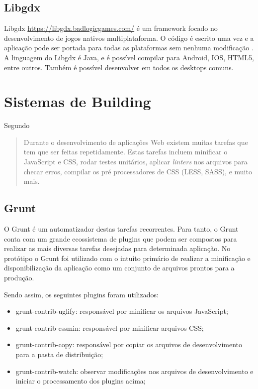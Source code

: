 \section{Libgdx}

Libgdx \url{https://libgdx.badlogicgames.com/} é um framework
focado no desenvolvimento de jogos nativos multiplataforma. O
código é escrito uma vez e a aplicação pode ser portada para
todas as plataformas sem nenhuma modificação \autocite[p.
8]{crossPlatformMobileGameDevelopment}. A linguagem do Libgdx é Java, e
é possível compilar para Android, IOS, HTML5, entre outros. Também é
possível desenvolver em todos os desktops comuns.

\chapter{Sistemas de Building}

Segundo \citet{gruntTutorial}
\begin{quote}
Durante o desenvolvimento de aplicações Web existem muitas tarefas
que tem que ser feitas repetidamente. Estas tarefas incluem minificar o
JavaScript e CSS, rodar testes unitários, aplicar \textit{linters} nos
arquivos para checar erros, compilar os pré processadores de CSS (LESS,
SASS), e muito mais.
\end{quote}

\section{Grunt} 
\label{grunt}

O Grunt é um automatizador destas tarefas recorrentes. Para tanto, o
Grunt conta com um grande ecossistema de plugins que podem ser compostos
para realizar as mais diversas tarefas desejadas para determinada
aplicação. No protótipo o Grunt foi utilizado com o intuito primário
de realizar a minificação e disponibilização da aplicação como um
conjunto de arquivos prontos para a produção.

Sendo assim, os seguintes plugins foram utilizados:
\begin{itemize}
    \item grunt-contrib-uglify: responsável por minificar os arquivos JavaScript;
    \item grunt-contrib-cssmin: responsável por minificar arquivos CSS;
    \item grunt-contrib-copy: responsável por copiar os arquivos de desenvolvimento para a pasta de distribuição;
    \item grunt-contrib-watch: observar modificações nos arquivos de desenvolvimento e iniciar o processamento dos plugins acima;
\end{itemize}

